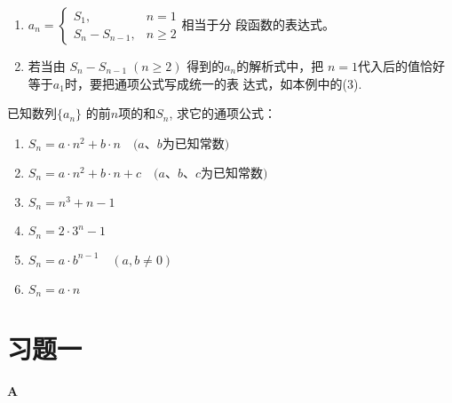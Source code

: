 \begin{rmk}
\begin{enumerate}[(1)]
    \item $a_n=\begin{cases}
        S_1,&n=1\\
        S_n-S_{n-1},&n\ge 2
    \end{cases}$相当于分
    段函数的表达式。
    \item 若当由
    $ S_n-S_{n-1}\; (n\ge 2)$
    得到的$a_n$的解析式中，把
    $n=1$代入后的值恰好等于$a_1$时，要把通项公式写成统一的表
    达式，如本例中的(3).
\end{enumerate}
\end{rmk}


\begin{ex}
    已知数列$\{a_n\}$
的前$n$项的和$S_n$, 求它的通项公式：
\begin{enumerate}
    \item $S_n=a\cdot n^2+b\cdot n\quad \text{($a$、$b$为已知常数)}$
    \item   $S_{n}=a\cdot n^{2}+b\cdot n+c\quad  \text{($a$、$b$、$c$为已知常数)}$
    \item  $S_n=n^3+n-1$
    \item  $S_{n}=2\cdot 3^{n}-1$
    \item  $S_{n}=a\cdot b^{n-1}\quad (a,b\neq0)$
    \item  $S_{n}=a\cdot n$
\end{enumerate}
\end{ex}

\section*{习题一}
\begin{center}
    \bfseries A
\end{center}

